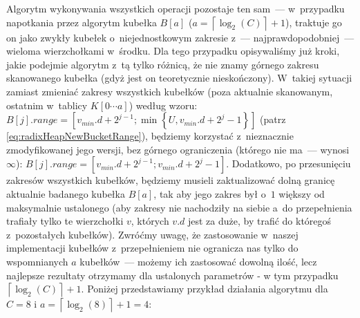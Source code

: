 Algorytm wykonywania wszystkich operacji pozostaje ten sam~--- w~przypadku napotkania przez algorytm kubełka $B \left[ a  \right]$ ($a = \left \lceil \log_{2} \left( C \right) \right \rceil + 1$), traktuje go on jako zwykły kubełek o~niejednostkowym zakresie z~--- najprawdopodobniej~--- wieloma wierzchołkami w~środku. Dla tego przypadku opisywaliśmy już kroki, jakie podejmie algorytm z~tą tylko różnicą, że nie znamy górnego zakresu skanowanego kubełka (gdyż jest on teoretycznie nieskończony). W~takiej sytuacji zamiast zmieniać zakresy wszystkich kubełków (poza aktualnie skanowanym, ostatnim w~tablicy $K \left[ 0 \cdots a \right]$) według wzoru: $B \left[ j \right].range = \left[ v_{min}.d + 2 ^{j-1} ; \min \left\{ U, v_{min}.d + 2^{j} - 1 \right\} \right]$ (patrz \ref{eq:radixHeapNewBucketRange}), będziemy korzystać z~nieznacznie zmodyfikowanej jego wersji, bez górnego ograniczenia (którego nie ma~--- wynosi $\infty$):  $B \left[ j \right].range = \left[ v_{min}.d + 2 ^{j-1} ; v_{min}.d + 2^{j} - 1 \right]$. Dodatkowo, po przesunięciu zakresów wszystkich kubełków, będziemy musieli zaktualizować dolną granicę aktualnie badanego kubełka $B \left[ a \right]$, tak aby jego zakres był o~$1$ większy od maksymalnie ustalonego (aby zakresy nie nachodziły na siebie a~do przepełnienia trafiały tylko te wierzchołki $v$, których $v.d$ jest za duże, by trafić do któregoś z~pozostałych kubełków). Zwróćmy uwagę, że zastosowanie w~naszej implementacji kubełków z~przepełnieniem nie ogranicza nas tylko do wspomnianych $a$ kubełków~--- możemy ich zastosować dowolną ilość, lecz najlepsze rezultaty otrzymamy dla ustalonych parametrów - w tym przypadku $\left \lceil \log_{2} \left( C \right) \right \rceil + 1$. Poniżej przedstawiamy przykład działania algorytmu dla $C=8$ i $a = \left \lceil \log_{2} \left( 8 \right) \right \rceil + 1 = 4$:

